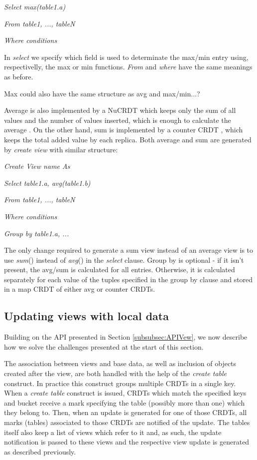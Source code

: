 \documentclass{vldb}
\newcommand{\grumbler}[2]{{\color{red}{\bf #1:} #2}}
\newcommand{\andre}[1]{\grumbler{andre}{#1}}
\newcommand{\emphvspace}{0.5\baselineskip}
\newcommand{\firstblockemph}[1]{\vspace{\emphvspace}\hspace{2em}\emph{#1}}
\newcommand{\middleblockemph}[1]{\hspace{2em}\emph{#1}}
\newcommand{\lastblockemph}[1]{\hspace{2em}\emph{#1}\vspace{\emphvspace}}
\begin{document}
\middleblockemph{Select max(table1.a)}

\middleblockemph{From table1, ..., tableN}

\lastblockemph{Where conditions}

In \emph{select} we specify which field is used to determinate the max/min entry using, respectivelly, the max or min functions.
\emph{From} and \emph{where} have the same meanings as before.

\andre{Max could also have the same structure as avg and max/min...?}

Average is also implemented by a NuCRDT which keeps only the sum of all values and the number of values inserted, which is enough to calculate the average \cite{???}.
On the other hand, sum is implemented by a counter CRDT \cite{???}, which keeps the total added value by each replica.
Both average and sum are generated by \emph{create view} with similar structure:

\firstblockemph{Create View name As}

\middleblockemph{Select table1.a, avg(table1.b)}

\middleblockemph{From table1, ..., tableN}

\middleblockemph{Where conditions}

\lastblockemph{Group by table1.a, ...}

The only change required to generate a sum view instead of an average view is to use \emph{sum}() instead of \emph{avg}() in the \emph{select} clause.
Group by is optional - if it isn't present, the avg/sum is calculated for all entries. Otherwise, it is calculated separately for each value of the tuples specified in the group by clause and stored in a map CRDT of either avg or counter CRDTs.

\subsection{Updating views with local data}

Building on the API presented in Section \ref{subsubsec:APIVew}, we now describe how we solve the challenges presented at the start of this section.

The association between views and base data, as well as inclusion of objects created after the view, are both handled with the help of the \emph{create table} construct.
In practice this construct groups multiple CRDTs in a single key.
When a \emph{create table} construct is issued, CRDTs which match the specified keys and bucket receive a mark specifying the table (possibly more than one) which they belong to.
Then, when an update is generated for one of those CRDTs, all marks (tables) associated to those CRDTs are notified of the update.
The tables itself also keep a list of views which refer to it and, as such, the update notification is passed to these views and the respective view update is generated as described previously.
\end{document}
